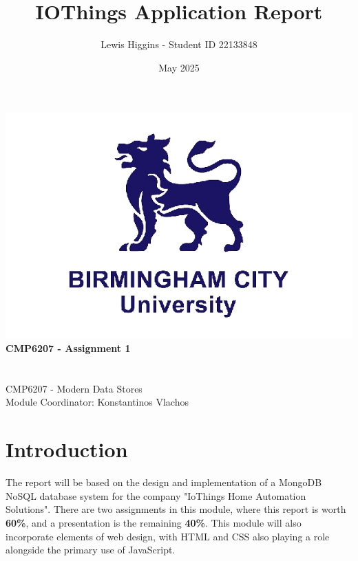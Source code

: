 \documentclass[12pt]{report}
\title{IOThings Application Report}
\author{Lewis Higgins - Student ID 22133848}
\date{May 2025}
\begin{document}
\makeatletter
\begin{titlepage}
    \begin{center}
        \includegraphics[width=0.7\linewidth]{BCU}\\[4ex]
        {\huge \bfseries CMP6207 - Assignment 1}\\[2ex]
        {\large \bfseries  \@title}\\[50ex]
        {\@author}\\[2ex]
        {CMP6207 - Modern Data Stores}\\[2ex]
        {Module Coordinator: Konstantinos Vlachos}\\[5ex]
    \end{center}
\end{titlepage}
\makeatother
\thispagestyle{empty}
\newpage


\setcounter{page}{0}

\tableofcontents
\thispagestyle{empty}

\chapter*{Introduction}
The report will be based on the design and implementation of a MongoDB NoSQL database system 
for the company "IoThings Home Automation Solutions". There are two assignments in this module, where this report is
worth \textbf{60\%}, and a presentation is the remaining \textbf{40\%}. This module 
will also incorporate elements of web design, with HTML and CSS also playing a role alongside the primary 
use of JavaScript.
\end{document}
